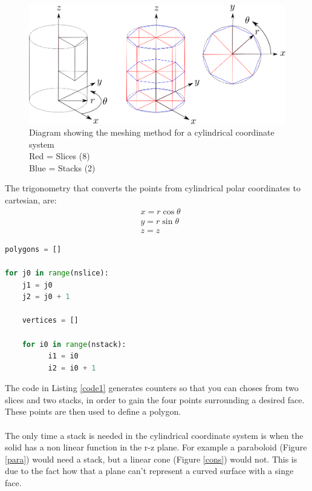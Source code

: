 \documentclass[12pt,a4paper]{article}
\begin{document}
\begin{figure}[h!]
\centering
\includegraphics[scale=0.45]{Images//Coords//cyl.png}
\caption[width=\columnwidth]{Diagram showing the meshing method for a cylindrical coordinate system\\
Red = Slices   (8)\\
Blue = Stacks (2)}
\label{cylmeshin}
\end{figure}
\vspace{0.3cm}
The trigonometry that converts the points from cylindrical polar coordinates to cartesian, are:
\begin{equation}
\begin{aligned}
\label{cyctrig}
& x = r \cos{\theta} \\
& y = r \sin{\theta} \\
& z = z
\end{aligned}
\end{equation}

\newpage
\begin{lstlisting}[language=Python, label=code1, caption=Basic method structure for Pyg4ometry primitive meshing of solids]
polygons = []

for j0 in range(nslice):
    j1 = j0
    j2 = j0 + 1
    
    vertices = []

    for i0 in range(nstack):
          i1 = i0
          i2 = i0 + 1     

\end{lstlisting}
The code in Listing \ref{code1} generates counters so that you can choses from two slices and two stacks, in order to gain the four points surrounding a desired face. These points are then used to define a polygon. 
\\\\
The only time a stack is needed in the cylindrical coordinate system is when the solid has a non linear function in the r-z plane. For example a paraboloid (Figure \ref{para}) would need a stack, but a linear cone (Figure \ref{cons}) would not. This is due to the fact how that a plane can't represent a curved surface with a singe face. 
\end{document}
